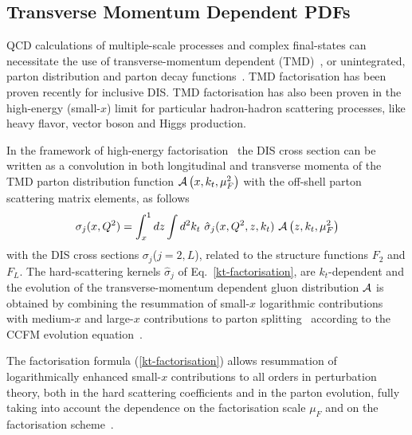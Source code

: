 \subsection{Transverse Momentum Dependent PDFs}


\def\kt{\ensuremath{k_t}}
\def\pt{\ensuremath{p_t}}


QCD calculations of multiple-scale processes  and complex final-states
can necessitate the use of transverse-momentum dependent (TMD)~\cite{Collins:2011zzd}, or 
unintegrated, parton distribution and parton decay 
functions~\cite{Aybat:2011zv,Buffing:2013eka,Buffing:2013kca,Buffing:2012sz,Mulders:2008tf,Jadach:2009gm,Hautmann:2009zzb,Hautmann:2012pf,Hautmann:2007gw}.   
TMD factorisation has been proven recently \cite{Collins:2011zzd} for inclusive DIS. TMD factorisation has also been proven in the high-energy (small-$x$) limit \cite{Catani:1990xk,Collins:1991ty,Hautmann:2010be} for 
particular hadron-hadron scattering processes, like heavy flavor, vector boson and Higgs production.
  
In the framework of high-energy factorisation~\cite{Catani:1990xk,Catani:1990eg,Catani:1993ww} 
the DIS cross section can be written as a convolution in 
both longitudinal and transverse momenta of the TMD parton distribution function 
${\cal A}\left(x,\kt,\mu_{F}^2\right)$    
 with the off-shell parton scattering matrix elements, as follows 
\begin{equation}
 \sigma_j (x, Q^2) = \int_x^1  
d z \int d^2k_t \ 
\hat{\sigma}_j(x,Q^2,{z},k_t) \ 
 {\cal  A}\left( {z} ,\kt, \mu_{F}^2 \right) 
\label{kt-factorisation}
\end{equation}
with the DIS cross sections 
$\sigma_j$($j= 2 , L$),  related to the  structure functions $F_2$ and $F_L$.
The hard-scattering kernels ${\hat \sigma}_j$ of Eq.~\ref{kt-factorisation},    are $k_t$-dependent and the evolution  of the 
transverse-momentum dependent gluon distribution 
${\cal A} $ is obtained by combining the resummation of small-$x$ logarithmic 
contributions \cite{Lipatov:1996ts,Fadin:1975cb,Balitsky:1978ic} with medium-$x$ and large-$x$ 
contributions to parton  splitting~\cite{Gribov:1972ri,Altarelli:1977zs,Dokshitzer:1977sg} according to the 
CCFM evolution equation~\cite{Ciafaloni:1987ur,Catani:1989sg,Marchesini:1994wr}.
  
The factorisation formula (\ref{kt-factorisation})  
allows resummation of logarithmically enhanced small-$x$ contributions  
to all orders in perturbation theory,  
both in the  hard scattering coefficients and 
in the parton evolution, fully taking into account the 
dependence on the factorisation scale $\mu_{F}$ and on the 
factorisation scheme~\cite{Catani:1994sq,Catani:1993rn}.  
 
